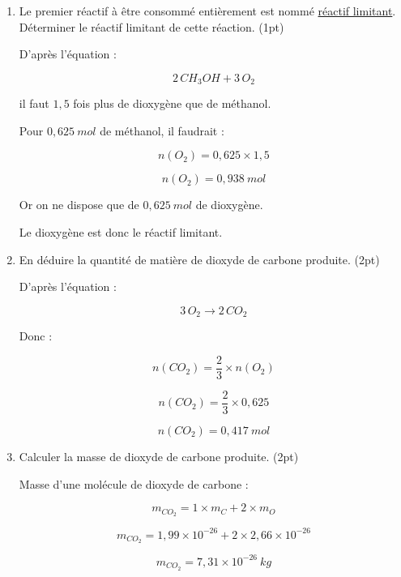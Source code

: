 \documentclass[a4paper,11pt,fleqn]{scrartcl}
\begin{document}
\begin{enumerate}
    \[
    m_{O_2}=5,32\times10^{-26}~kg
    \]

    Nombre de molécules dans l’échantillon :

    \[
    N(O_2)=\frac{2,0\times10^{-2}}{5,32\times10^{-26}}
    \]

    \[
    N(O_2)=3,76\times10^{23}
    \]

    Quantité de matière :

    \[
    n(O_2)=\frac{3,76\times10^{23}}{6,02\times10^{23}}
    \]

    \[
    n(O_2)=0,625~mol
    \]

    \item Le premier réactif à être consommé entièrement est nommé \underline{réactif limitant}. Déterminer le réactif limitant de cette réaction. (1pt)

    D’après l’équation :

    \[
    2\,CH_3OH + 3\,O_2
    \]

    il faut $1,5$ fois plus de dioxygène que de méthanol.

    Pour $0,625~mol$ de méthanol, il faudrait :

    \[
    n(O_2)=0,625\times1,5
    \]

    \[
    n(O_2)=0,938~mol
    \]

    Or on ne dispose que de $0,625~mol$ de dioxygène.

    Le dioxygène est donc le réactif limitant.

    \item En déduire la quantité de matière de dioxyde de carbone produite. (2pt)

    D’après l’équation :

    \[
    3\,O_2 \rightarrow 2\,CO_2
    \]

    Donc :

    \[
    n(CO_2)=\frac{2}{3}\times n(O_2)
    \]

    \[
    n(CO_2)=\frac{2}{3}\times0,625
    \]

    \[
    n(CO_2)=0,417~mol
    \]

    \item Calculer la masse de dioxyde de carbone produite. (2pt)

    Masse d’une molécule de dioxyde de carbone :

    \[
    m_{CO_2}=1\times m_C+2\times m_O
    \]

    \[
    m_{CO_2}=1,99\times10^{-26}+2\times2,66\times10^{-26}
    \]

    \[
    m_{CO_2}=7,31\times10^{-26}~kg
    \]


\end{enumerate}
\end{document}
